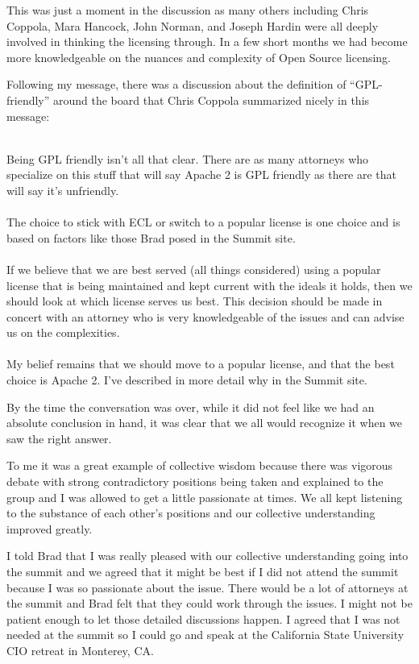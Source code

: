 \documentclass[12pt]{book}
\begin{document}
This was just a moment in the discussion as many
others including Chris Coppola, Mara Hancock,
John Norman, and Joseph Hardin were all deeply
involved in thinking the licensing through.  In
a few short months we had become more knowledgeable
on the nuances and complexity of Open Source
licensing.

Following my message, there was a discussion
about the definition of ``GPL-friendly''
around the board that Chris Coppola summarized
nicely in this message:\\
\\
\begin{sf}
Being GPL friendly isn't all that clear. There are as
many attorneys who specialize on this stuff that will
say Apache 2 is GPL friendly as there are that will
say it's unfriendly.\\
\\
The choice to stick with ECL or switch to a popular
license is one choice and is based on factors like
those Brad posed in the Summit site. \\
\\
If we believe that we are best served (all things
considered) using a popular license that is being maintained
and kept current with the ideals it holds, then we
should look at which license serves us best. This
decision should be made in concert with an attorney who
is very knowledgeable of the issues and can advise us
on the complexities.\\
\\
My belief remains that we should move to a popular license,
and that the best choice is Apache 2. I've described in
more detail why in the Summit site.\\
\end{sf}

By the time the conversation was over, while it did not
feel like we had an absolute conclusion in hand, it was
clear that we all would recognize it when we saw
the right answer.

To me it was a great example of collective wisdom because
there was vigorous debate with strong contradictory positions
being taken and explained to the group and I was allowed
to get a little passionate at times.  We all kept listening
to the substance of each other's positions and our
collective understanding improved greatly.

I told Brad that I was really pleased with our collective
understanding going into the summit and we
agreed that it might be best if I did not attend the summit
because I was so passionate about the issue.   There would
be a lot of attorneys at the summit and Brad felt that
they could work through the issues.  I might
not be patient enough to let those detailed discussions
happen.  I agreed that I was not needed at the summit
so I could go and speak at the California State University
CIO retreat in Monterey, CA.
\end{document}
